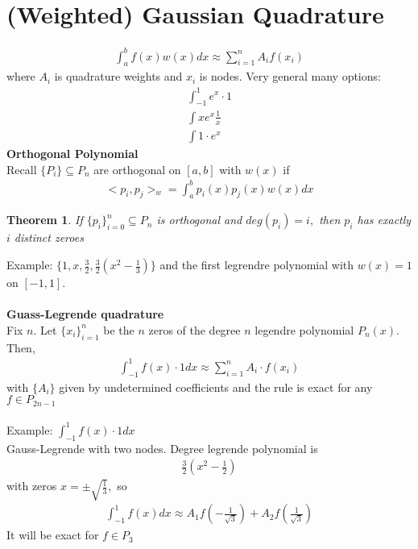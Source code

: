 \documentclass[11pt,oneside]{book}
\theoremstyle{break}
\theoremstyle{break}
\newtheorem{thm}{Theorem}[section]
\newcommand{\example}{\color{purple}Example: \color{black}}
\begin{document}
\section[(Weighted) Gaussian Quadrature]{(Weighted) Gaussian Quadrature}
\begin{align*}
\int_{a}^{b}f(x)w(x)dx\approx \sum_{i=1}^nA_{i}f(x_i)
\end{align*}
where $A_i$ is quadrature weights and $x_i$ is nodes. Very general many options:\begin{align*}
\int_{-1}^{1}e^x\cdot 1\\
\int xe^{x}\frac{1}{x}\\
\int 1\cdot e^x
\end{align*}
\textbf{Orthogonal Polynomial}\\
Recall $\{P_i\}\subseteq P_n$ are orthogonal on $[a,b]$ with $w(x)$ if \begin{align*}
<p_i,p_j>_{w}=\int_{a}^{b}p_i(x)p_j(x)w(x)dx
\end{align*}
\begin{thm}
If $\{p_i\}^{n}_{i=0}\subseteq P_n$ is orthogonal and $deg(p_i)=i,$ then $p_i$ has exactly $i$ distinct  zeroes\end{thm}
\example $\{1,x,\frac{3}{2},\frac{3}{2}(x^2-\frac{1}{3})\}$ and the first legrendre polynomial with $w(x)=1$ on $[-1,1]$.\\
\hfill\\
\textbf{Guass-Legrende quadrature}\\
Fix $n$. Let $\{x_i\}_{i=1}^n$ be the $n$ zeros of the degree $n$ legendre polynomial $P_n(x).$\\
Then, \begin{align*}
\int_{-1}^{1}f(x)\cdot 1dx\approx \sum_{i=1}^n A_i\cdot f(x_i)
\end{align*}
with $\{A_i\}$ given by undetermined coefficients and the rule is exact for any $f\in P_{2n-1}$\\
\hfill\\
\example $\int_{-1}^{1}f(x)\cdot 1 dx$\\
Gauss-Legrende with two nodes. Degree legrende polynomial is \begin{align*}
\frac{3}{2}(x^2-\frac{1}{2})
\end{align*}
with zeros $x=\pm \sqrt{\frac{1}{3}},$ so \begin{align*}
\int_{-1}^{1}f(x)dx\approx A_{1}f\left(-\frac{1}{\sqrt{3}} \right)+A_2f\left(\frac{1}{\sqrt{3}} \right)
\end{align*}
It will be exact for $f\in P_3$\\
\end{document}
